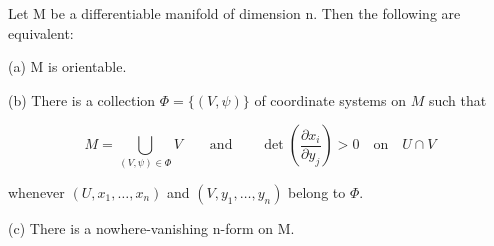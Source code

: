 \begin{proposition}\label{thm:4.2}
Let M be a differentiable manifold of dimension n. Then the following are equivalent:

(a) M is orientable.

(b) There is a collection $\Phi = \{(V,\psi)\}$ of coordinate systems on $M$ such that

\begin{equation}
\tag{1}\label{eq:4.2:1}
M=\bigcup_{(V,\psi)\in\Phi}V\qquad\mathrm{and}\qquad\det\left(\frac{\partial x_{i}}{\partial y_{j}}\right)>0\quad\mathrm{on}\quad U\cap V
\end{equation}

whenever $(U, x_{1}, \ldots, x_{n})$ and $(V, y_{1}, \ldots, y_{n})$ belong to $\Phi$.

(c) There is a nowhere-vanishing n-form on M.

\end{proposition}

